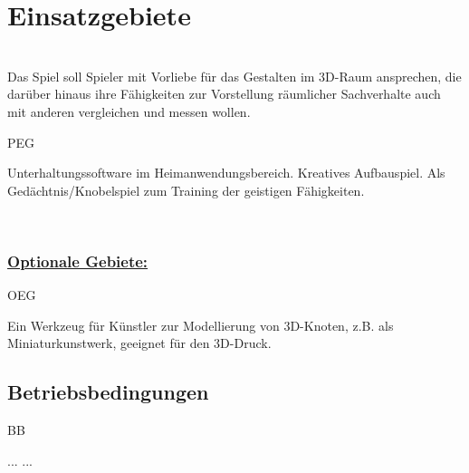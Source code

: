 %
%


\chapter{Einsatzgebiete}
\label{ES}~\\



Das Spiel soll Spieler mit Vorliebe für das Gestalten im 3D-Raum ansprechen, die darüber hinaus ihre Fähigkeiten zur Vorstellung räumlicher Sachverhalte auch mit anderen vergleichen und messen wollen.\\



\begin{ids}{\gls{PEG}}

	\id[10] Unterhaltungssoftware im Heimanwendungsbereich.
	\id[20] Kreatives Aufbauspiel.
	\id[30] Als Gedächtnis/Knobelspiel zum Training der geistigen Fähigkeiten.

\end{ids}

~\\

\subsection*{\underline{Optionale Gebiete:}}

\begin{ids}{\gls{OEG}}

	\id[10] Ein Werkzeug für Künstler zur Modellierung von 3D-Knoten, z.B. als Miniaturkunstwerk, geeignet für den 3D-Druck.

\end{ids}


%
%
\clearpage


\section{Betriebsbedingungen}
\label{ES:BB}

\begin{ids}{\gls{BB}}

	\id[ 11] ...
	\id[100] ...

\end{ids}



